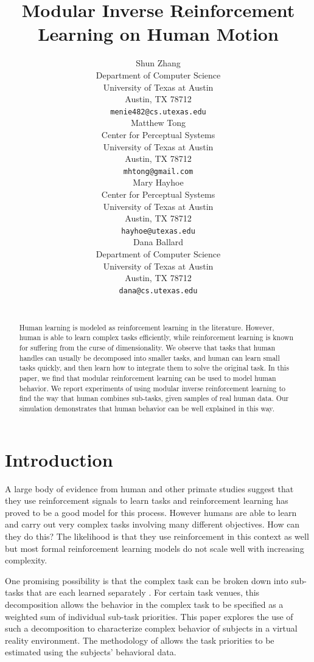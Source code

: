 \documentclass[11pt]{article} %
\title{Modular Inverse Reinforcement Learning on Human Motion}
\author{
Shun Zhang\\
Department of Computer Science\\
University of Texas at Austin\\
Austin, TX 78712 \\
\texttt{menie482@cs.utexas.edu} \\
\And
Matthew Tong \\
Center for Perceptual Systems\\
University of Texas at Austin\\
Austin, TX 78712 \\
\texttt{mhtong@gmail.com} \\
\AND
Mary Hayhoe \\
Center for Perceptual Systems\\
University of Texas at Austin\\
Austin, TX 78712 \\
\texttt{hayhoe@utexas.edu} \\
\And
Dana Ballard \\
Department of Computer Science\\
University of Texas at Austin\\
Austin, TX 78712 \\
\texttt{dana@cs.utexas.edu} \\
\\
}
\begin{document}
\maketitle

\begin{abstract}
Human learning is modeled as reinforcement learning in the literature. However,
human is able to learn complex tasks efficiently, while reinforcement
learning is known for suffering from the curse of dimensionality. We observe that
tasks that human handles can usually be decomposed into smaller tasks, and human can
learn small tasks quickly, and then learn how to integrate them to solve the
original task. In this paper, we find that modular reinforcement learning can be
used to model human behavior. We report experiments of using modular inverse
reinforcement learning to find the way that human combines sub-tasks, given
samples of real human data. Our simulation demonstrates that human behavior can
be well explained in this way.
\end{abstract}


\startmain %

\section{Introduction}

A large body of evidence from human and other primate studies 
suggest that they use reinforcement signals to learn tasks and reinforcement 
learning has proved to be a good model for this process.
However humans are able to learn and carry out very complex tasks involving 
many different objectives. 
How can they do this? The likelihood is that they use reinforcement in this 
context as well but most formal reinforcement learning models do not scale 
well with increasing complexity.

One promising possibility is that the complex task can be broken down into 
sub-tasks that are each learned separately \cite{sprague2003multiple,
rothkopf2013modular, dietterich2000hierarchical}. 
For certain task venues, this decomposition allows the behavior in the complex 
task to be specified as a weighted sum of individual sub-task priorities.
This paper explores the use of such a decomposition to characterize complex
behavior of subjects in a virtual reality environment. The methodology of
\cite{rothkopf2013modular} allows the task priorities to be estimated using the
subjects' behavioral data.
\end{document}
